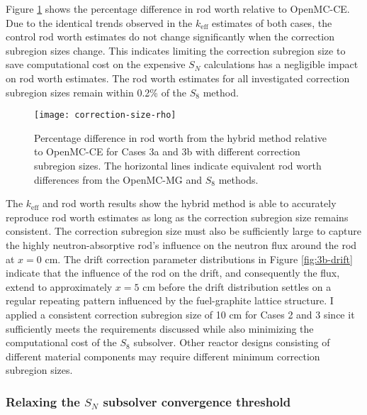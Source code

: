 Figure \ref{fig:v1-size-rho} shows the percentage difference in rod worth relative to OpenMC-CE. 
Due to the identical trends observed in the $k_\text{eff}$ estimates of both cases, the control rod
worth estimates do not change significantly when the correction subregion
sizes change. This indicates limiting the correction subregion size to save
computational cost on the expensive $S_N$ calculations has a negligible impact on rod worth
estimates. The rod worth estimates for all investigated correction subregion sizes remain within
0.2\% of the $S_8$ method.

\begin{figure}[htb!]
  \centering
  \texttt{[image: correction-size-rho]}
  \caption{Percentage difference in rod worth from the hybrid method relative to OpenMC-CE for
    Cases 3a and 3b with different correction subregion sizes. The horizontal lines indicate
    equivalent rod worth differences from the OpenMC-MG and $S_8$ methods.}
  \label{fig:v1-size-rho}
\end{figure}

The $k_\text{eff}$ and rod worth results show the hybrid method is able to accurately
reproduce rod worth estimates as long as the correction subregion size remains consistent. The
correction subregion size must also be sufficiently large to capture the highly neutron-absorptive
rod's influence on the neutron flux around the rod at $x=0$ cm. The drift correction parameter
distributions in Figure \ref{fig:3b-drift} indicate that the influence of the rod on the drift, and
consequently the flux, extend to approximately $x=5$ cm before the drift distribution settles on a
regular repeating pattern influenced by the fuel-graphite lattice structure. I applied a consistent
correction subregion size of 10 cm for Cases 2 and 3 since it sufficiently meets the requirements
discussed while also minimizing the computational cost of the $S_8$ subsolver. Other reactor
designs consisting of different material components may require different minimum correction
subregion sizes.

\subsubsection{Relaxing the $S_N$ subsolver convergence threshold}

